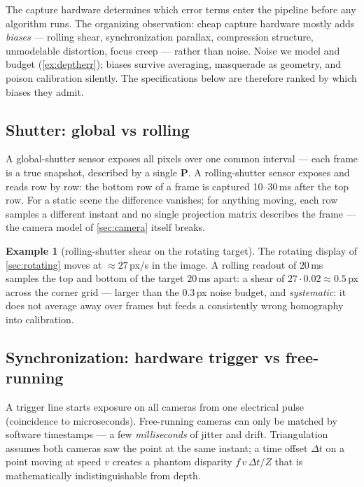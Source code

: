 \documentclass[11pt]{article}
\theoremstyle{definition}
\newtheorem{example}{Example}
\newcommand{\mat}[1]{\mathbf{#1}}
\newcommand{\PP}{\mat{P}}
\begin{document}
The capture hardware determines which error terms enter the pipeline before
any algorithm runs. The organizing observation: cheap capture hardware
mostly adds \emph{biases} --- rolling shear, synchronization parallax,
compression structure, unmodelable distortion, focus creep --- rather than
noise. Noise we model and budget (\autoref{ex:deptherr}); biases survive
averaging, masquerade as geometry, and poison calibration silently. The
specifications below are therefore ranked by which biases they admit.

\subsection{Shutter: global vs rolling}
\label{sec:shutter}

A global-shutter sensor exposes all pixels over one common interval --- each
frame is a true snapshot, described by a single $\PP$. A rolling-shutter
sensor exposes and reads row by row: the bottom row of a frame is captured
10--30\,ms after the top row. For a static scene the difference vanishes;
for anything moving, each row samples a different instant and no single
projection matrix describes the frame --- the camera model of
\autoref{sec:camera} itself breaks.

\begin{example}[rolling-shutter shear on the rotating target]
\label{ex:rolling}
The rotating display of \autoref{sec:rotating} moves at
$\approx27$\,px/s in the image. A rolling readout of $20$\,ms samples the
top and bottom of the target $20$\,ms apart: a shear of
$27\cdot0.02\approx0.5$\,px across the corner grid --- larger than the
$0.3$\,px noise budget, and \emph{systematic}: it does not average away
over frames but feeds a consistently wrong homography into calibration.
\end{example}

\subsection{Synchronization: hardware trigger vs free-running}
\label{sec:trigger}

A trigger line starts exposure on all cameras from one electrical pulse
(coincidence to microseconds). Free-running cameras can only be matched by
software timestamps --- a few \emph{milliseconds} of jitter and drift.
Triangulation assumes both cameras saw the point at the same instant; a
time offset $\Delta t$ on a point moving at speed $v$ creates a phantom
disparity $f\,v\,\Delta t/Z$ that is mathematically indistinguishable from
depth.
\end{document}
